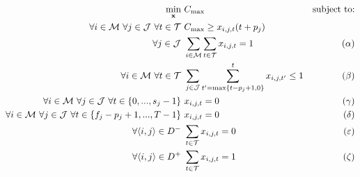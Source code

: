\documentclass[10pt, a4paper]{report}
\begin{document}
	
	
	
\begin{align*}
	\min_{\mathbf{x}}\ &C_{\max}&\text{subject to:}\\
	\forall i\in\mathcal{M}\ \forall j\in\mathcal{J}\ \forall t\in\mathcal{T}\ &C_{\max}\geq x_{i,j,t}(t+p_j)\\
	\forall j\in\mathcal{J}\ &\sum_{i\in\mathcal{M}}\sum_{t\in\mathcal{T}}x_{i,j,t}=1&(\alpha)\\
	\forall i\in\mathcal{M}\ \forall t\in\mathcal{T}\ &\sum_{j\in\mathcal{J}}\sum_{t'=\max\{t-p_j+1,0\}}^t x_{i,j,t'}\leq 1&(\beta)\\
	\forall i\in\mathcal{M}\ \forall j\in\mathcal{J}\ \forall t\in\{0,...,s_j-1\}\ &x_{i,j,t}=0&(\gamma)\\
	\forall i\in\mathcal{M}\ \forall j\in\mathcal{J}\ \forall t\in\{f_j-p_j+1,...,T-1\}\ &x_{i,j,t}=0&(\delta)\\
	\forall\pair{i}{j}\in D^-\ &\sum_{t\in\mathcal{T}}x_{i,j,t}=0&(\varepsilon)\\
	\forall\pair{i}{j}\in D^+\ &\sum_{t\in\mathcal{T}}x_{i,j,t}=1&(\zeta)\\
\end{align*}
\end{document}
